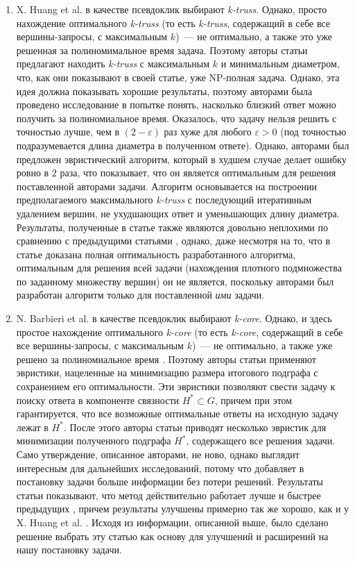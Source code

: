 \begin{enumerate}
  \item X. Huang et al. \cite{Huang15} в качестве псевдоклик выбирают \textit{k-truss}. Однако, просто нахождение оптимального \textit{k-truss} (то есть \textit{k-truss}, содержащий в себе все вершины-запросы, с максимальным $k$)~--- не оптимально, а также это уже решенная за полиномимальное время задача. Поэтому авторы статьи предлагают находить \textit{k-truss} с максимальным $k$ и минимальным диаметром, что, как они показывают в своей статье, уже NP-полная задача. Однако, эта идея должна показывать хорошие результаты, поэтому авторами была проведено исследование в попытке понять, насколько близкий ответ можно получить за полиномиальное время. Оказалось, что задачу нельзя решить с точностью лучше, чем в $(2 - \varepsilon)$ раз хуже для любого $\varepsilon > 0$ (под точностью подразумевается длина диаметра в полученном ответе). Однако, авторами был предложен эвристический алгоритм, который в худшем случае делает ошибку ровно в $2$ раза, что показывает, что он является оптимальным для решения поставленной авторами задачи. Алгоритм основывается на построении предполагаемого максимального \textit{k-truss} с последующий итеративным удалением вершин, не ухудшающих ответ и уменьшающих длину диаметра. Результаты, полученные в статье также являются довольно неплохими по сравнению с предыдущими статьями \cite{Sozio10, Wu15}, однако, даже несмотря на то, что в статье доказана полная оптимальность разработанного алгоритма, оптимальным для решения всей задачи (нахождения плотного подмножества по заданному множеству вершин) он не является, поскольку авторами был разработан алгоритм только для поставленной \textit{ими} задачи. 

  \item N. Barbieri et al. \cite{Barbieri15} в качестве псевдоклик выбирают \textit{k-core}. Однако, и здесь простое нахождение оптимального \textit{k-core} (то есть \textit{k-core}, содержащий в себе все вершины-запросы, с максимальным $k$)~--- не оптимально, а также уже решено за полиномиальное время \cite{Sozio10}. Поэтому авторы статьи применяют эвристики, нацеленные на минимизацию размера итогового подграфа с сохранением его оптимальности. Эти эвристики позволяют свести задачу к поиску ответа в компоненте связности $H^* \subset G$, причем при этом гарантируется, что все возможные оптимальные ответы на исходную задачу лежат в $H^*$. После этого авторы статьи приводят несколько эвристик для минимизации полученного подграфа $H^*$, содержащего все решения задачи. Само утверждение, описанное авторами, не ново, однако выглядит интересным для дальнейших исследований, потому что добавляет в постановку задачи больше информации без потери решений. Результаты статьи показывают, что метод действительно работает лучше и быстрее предыдущих \cite{Sozio10, Cui14}, причем результаты улучшены примерно так же хорошо, как и у X. Huang et al. \cite{Huang15}. Исходя из информации, описанной выше, было сделано решение выбрать эту статью как основу для улучшений и расширений на нашу постановку задачи.


\end{enumerate}
